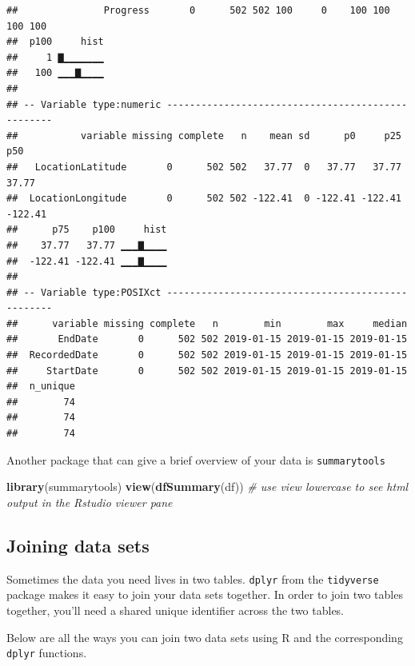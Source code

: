 \documentclass[]{book}
\newenvironment{Shaded}{\begin{snugshade}}{\end{snugshade}}
\newcommand{\KeywordTok}[1]{\textcolor[rgb]{0.13,0.29,0.53}{\textbf{#1}}}
\newcommand{\CommentTok}[1]{\textcolor[rgb]{0.56,0.35,0.01}{\textit{#1}}}
\newcommand{\NormalTok}[1]{#1}
\begin{document}
\begin{verbatim}
##               Progress       0      502 502 100     0    100 100 100 100
##  p100     hist
##     1 ▇▁▁▁▁▁▁▁
##   100 ▁▁▁▇▁▁▁▁
## 
## -- Variable type:numeric --------------------------------------------------
##           variable missing complete   n    mean sd      p0     p25     p50
##   LocationLatitude       0      502 502   37.77  0   37.77   37.77   37.77
##  LocationLongitude       0      502 502 -122.41  0 -122.41 -122.41 -122.41
##      p75    p100     hist
##    37.77   37.77 ▁▁▁▇▁▁▁▁
##  -122.41 -122.41 ▁▁▁▇▁▁▁▁
## 
## -- Variable type:POSIXct --------------------------------------------------
##      variable missing complete   n        min        max     median
##       EndDate       0      502 502 2019-01-15 2019-01-15 2019-01-15
##  RecordedDate       0      502 502 2019-01-15 2019-01-15 2019-01-15
##     StartDate       0      502 502 2019-01-15 2019-01-15 2019-01-15
##  n_unique
##        74
##        74
##        74
\end{verbatim}

Another package that can give a brief overview of your data is
\texttt{summarytools}

\begin{Shaded}
\begin{Highlighting}[]
\KeywordTok{library}\NormalTok{(summarytools)}
\KeywordTok{view}\NormalTok{(}\KeywordTok{dfSummary}\NormalTok{(df)) }\CommentTok{# use view lowercase to see html output in the Rstudio viewer pane}
\end{Highlighting}
\end{Shaded}

\subsection{Joining data sets}\label{joining-data-sets}

Sometimes the data you need lives in two tables. \texttt{dplyr} from the
\texttt{tidyverse} package makes it easy to join your data sets
together. In order to join two tables together, you'll need a shared
unique identifier across the two tables.

Below are all the ways you can join two data sets using R and the
corresponding \texttt{dplyr} functions.
\end{document}
